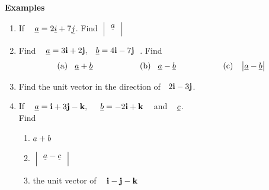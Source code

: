 \documentclass[11pt,a4paper]{article}
\begin{document}
\textbf{Examples}
\begin{enumerate}
\item If $\hspace{0.3cm} \underline{a} = 2\underline{i} + 7\underline{j}$. Find $\begin{vmatrix}
\underline{a}\\
\end{vmatrix}$\\


\item Find $\hspace{0.3cm} \underline{a} = 3\textbf{i} + 2\textbf{j}, \hspace{0.3cm} \underline{b} = 4\textbf{i} - 7\textbf{j}\hspace{0.2cm}$. Find 
$$(\text{a})\hspace{0.3cm} \underline{a} + \underline{b} \hspace{2cm} (\text{b})\hspace{0.3cm} \underline{a} - \underline{b} \hspace{2cm} (\text{c})\hspace{0.3cm} \begin{vmatrix}
\underline{a} - \underline{b}\\
\end{vmatrix}$$


\item Find the unit vector in the direction of $\hspace{0.2cm} 2\textbf{i} - 3\textbf{j}$.

\item If $\hspace{0.3cm} \underline{a} = \textbf{i} + 3\textbf{j} - \textbf{k}, \hspace{0.5cm} \underline{b} = -2\textbf{i} + \textbf{k}\hspace{0.3cm}$ and $\hspace{0.3cm} \underline{c}$.\\
Find
\begin{enumerate}
       \item $\underline{a} + \underline{b}$
       
       \item $\begin{vmatrix}
       \underline{a} - \underline{c}\\
       \end{vmatrix}$
       
       \item the unit vector of $\hspace{0.3cm}\textbf{i} - \textbf{j} - \textbf{k}$\\\\
\end{enumerate}
\end{enumerate}
\end{document}
